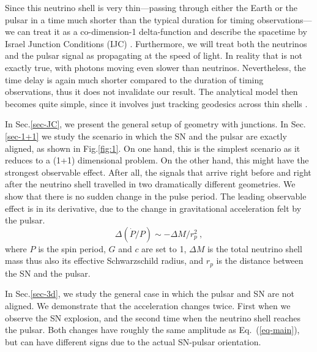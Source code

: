 \documentclass[aps,showpacs,twocolumn,floats,prd,superscriptaddress,nofootinbib]{revtex4}
\begin{document}
Since this neutrino shell is very thin---passing through either the Earth or the pulsar in a time much shorter than the typical duration for timing observations---we can treat it as a co-dimension-1 delta-function and describe the spacetime by Israel Junction Conditions (IJC) \cite{Isr66}. Furthermore, we will treat both the neutrinos and the pulsar signal as propagating at the speed of light. In reality that is not exactly true, with photons moving even slower than neutrinos. Nevertheless, the time delay is again much shorter compared to the duration of timing observations, thus it does not invalidate our result. The analytical model then becomes quite simple, since it involves just tracking geodesics across thin shells \cite{BouFre07,JohYan10}.

In Sec.\ref{sec-JC}, we present the general setup of geometry with junctions. In Sec.\ref{sec-1+1} we study the scenario in which the SN and the pulsar are exactly aligned, as shown in Fig.\ref{fig:1}. On one hand, this is the simplest scenario as it reduces to a (1+1) dimensional problem. On the other hand, this might have the strongest observable effect. After all, the signals that arrive right before and right after the neutrino shell travelled in two dramatically different geometries. We show that there is no sudden change in the pulse period.
The leading observable effect is in its derivative, due to the change in gravitational acceleration felt by the pulsar. 
\begin{equation}
\Delta(\dot{P}/P) \sim -\Delta M / r_p^2~,
\label{eq-main}
\end{equation}
where $P$ is the spin period, $G$ and $c$ are set to 1, $\Delta M$ is the total neutrino shell mass thus also its effective Schwarzschild radius, and $r_p$ is the distance between the SN and the pulsar. 

In Sec.\ref{sec-3d}, we study the general case in which the pulsar and SN are not aligned. We demonstrate that the acceleration changes twice. First when we observe the SN explosion, and the second time when the neutrino shell reaches the pulsar. Both changes have roughly the same amplitude as Eq.~(\ref{eq-main}), but can have different signs due to the actual SN-pulsar orientation. 
\end{document}
